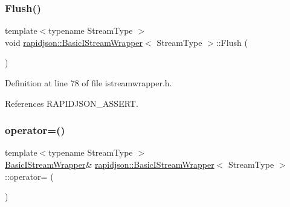 \subsubsection{\texorpdfstring{Flush()}{Flush()}}
{\footnotesize\ttfamily template$<$typename Stream\+Type $>$ \\
void \mbox{\hyperlink{classrapidjson_1_1_basic_i_stream_wrapper}{rapidjson\+::\+Basic\+I\+Stream\+Wrapper}}$<$ Stream\+Type $>$\+::Flush (\begin{DoxyParamCaption}{ }\end{DoxyParamCaption})}



Definition at line 78 of file istreamwrapper.\+h.


\begin{DoxyCode}{0}

\end{DoxyCode}


References R\+A\+P\+I\+D\+J\+S\+O\+N\+\_\+\+A\+S\+S\+E\+RT.

\mbox{\label{classrapidjson_1_1_basic_i_stream_wrapper_a5d6ec3d7776d701bce59a2d1277f7e93}} 
\subsubsection{\texorpdfstring{operator=()}{operator=()}}
{\footnotesize\ttfamily template$<$typename Stream\+Type $>$ \\
\mbox{\hyperlink{classrapidjson_1_1_basic_i_stream_wrapper}{Basic\+I\+Stream\+Wrapper}}\& \mbox{\hyperlink{classrapidjson_1_1_basic_i_stream_wrapper}{rapidjson\+::\+Basic\+I\+Stream\+Wrapper}}$<$ Stream\+Type $>$\+::operator= (\begin{DoxyParamCaption}\item[{const \mbox{\hyperlink{classrapidjson_1_1_basic_i_stream_wrapper}{Basic\+I\+Stream\+Wrapper}}$<$ Stream\+Type $>$ \&}]{ }\end{DoxyParamCaption})\hspace{0.3cm}{\ttfamily [private]}}


